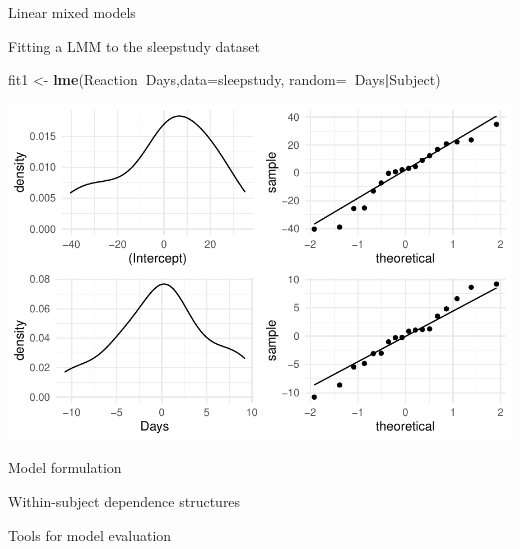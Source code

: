 \documentclass[
  ignorenonframetext,
]{beamer}
\newenvironment{Shaded}{\begin{snugshade}}{\end{snugshade}}
\newcommand{\DataTypeTok}[1]{\textcolor[rgb]{0.13,0.29,0.53}{#1}}
\newcommand{\KeywordTok}[1]{\textcolor[rgb]{0.13,0.29,0.53}{\textbf{#1}}}
\newcommand{\NormalTok}[1]{#1}
\newcommand{\OperatorTok}[1]{\textcolor[rgb]{0.81,0.36,0.00}{\textbf{#1}}}
\newcommand{\StringTok}[1]{\textcolor[rgb]{0.31,0.60,0.02}{#1}}
\begin{document}
\begin{frame}{Linear mixed models}
\protect\hypertarget{linear-mixed-models}{}

\end{frame}

\begin{frame}[fragile]{Fitting a LMM to the sleepstudy dataset}
\protect\hypertarget{fitting-a-lmm-to-the-sleepstudy-dataset}{}

\begin{Shaded}
\begin{Highlighting}[]
\NormalTok{fit1 <-}\StringTok{ }\KeywordTok{lme}\NormalTok{(Reaction}\OperatorTok{~}\NormalTok{Days,}\DataTypeTok{data=}\NormalTok{sleepstudy,}
            \DataTypeTok{random=}\OperatorTok{~}\NormalTok{Days}\OperatorTok{|}\NormalTok{Subject)}
\end{Highlighting}
\end{Shaded}

\begin{center}\includegraphics[width=0.7\linewidth]{codes_files/figure-beamer/fit1plot-1} \end{center}

\end{frame}

\begin{frame}{Model formulation}
\protect\hypertarget{model-formulation}{}

\end{frame}

\begin{frame}{Within-subject dependence structures}
\protect\hypertarget{within-subject-dependence-structures}{}

\end{frame}

\begin{frame}{Tools for model evaluation}
\protect\hypertarget{tools-for-model-evaluation}{}

\end{frame}
\end{document}
